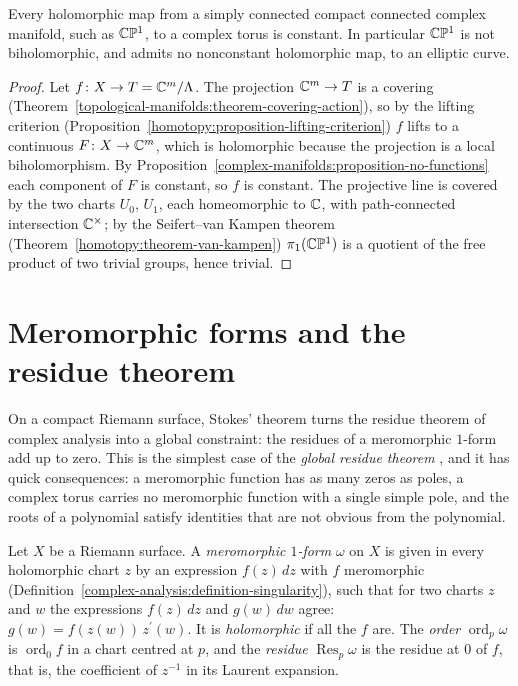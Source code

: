 \begin{corollary}\label{complex-manifolds:corollary-maps-to-tori}
Every holomorphic map from a simply connected compact connected complex manifold, such as $\mathbb{C}\mathbb{P}^1$, to a complex torus is constant. In particular $\mathbb{C}\mathbb{P}^1$ is not biholomorphic, and admits no nonconstant holomorphic
map, to an elliptic curve.
\end{corollary}

\begin{proof}
Let $f \colon X \to T = \mathbb{C}^m/\Lambda$. The projection $\mathbb{C}^m \to T$ is a covering (Theorem~\ref{topological-manifolds:theorem-covering-action}), so by the lifting criterion
(Proposition~\ref{homotopy:proposition-lifting-criterion}) $f$ lifts to a continuous $F \colon X \to \mathbb{C}^m$, which is holomorphic because the projection is a local biholomorphism. By
Proposition~\ref{complex-manifolds:proposition-no-functions} each component of $F$ is constant, so $f$ is constant. The projective line is covered by the two charts $U_0$, $U_1$, each homeomorphic to $\mathbb{C}$, with
path-connected intersection $\mathbb{C}^\times$; by the Seifert--van Kampen theorem (Theorem~\ref{homotopy:theorem-van-kampen}) $\pi_1(\mathbb{C}\mathbb{P}^1)$ is a quotient of the free product of two trivial groups, hence trivial.
\end{proof}

\section{Meromorphic forms and the residue theorem}\label{complex-manifolds:section-residues}

On a compact Riemann surface, Stokes' theorem turns the residue theorem of complex analysis into a global constraint: the residues of a meromorphic $1$-form add up to zero. This is
the simplest case of the \emph{global residue theorem} \cite[Chapter 5]{griffiths-harris}, and it has quick consequences: a meromorphic function has as many zeros as poles, a complex torus
carries no meromorphic function with a single simple pole, and the roots of a polynomial satisfy identities that are not obvious from the polynomial.

\begin{definition}\label{complex-manifolds:definition-meromorphic-form}
Let $X$ be a Riemann surface. A \emph{meromorphic $1$-form} $\omega$ on $X$ is given in every holomorphic chart $z$ by an expression $f(z)\,dz$ with $f$ meromorphic
(Definition~\ref{complex-analysis:definition-singularity}), such that for two charts $z$ and $w$ the expressions $f(z)\,dz$ and $g(w)\,dw$ agree: $g(w) = f(z(w))\,z^{\prime}(w)$. It is
\emph{holomorphic} if all the $f$ are. The \emph{order} $\operatorname{ord}_p\omega$ is $\operatorname{ord}_0f$ in a chart centred at $p$, and the \emph{residue} $\operatorname{Res}_p\omega$ is the
residue at $0$ of $f$, that is, the coefficient of $z^{-1}$ in its Laurent expansion.
\end{definition}

